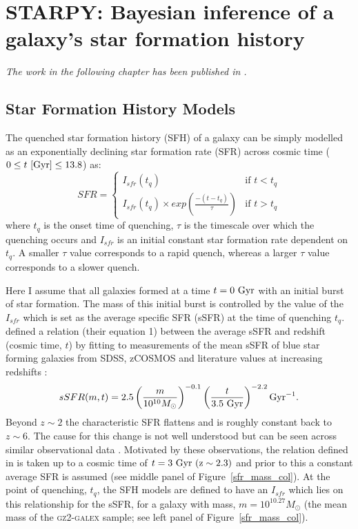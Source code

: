 \chapter{STARPY: Bayesian inference of a galaxy's star formation history}

\emph{The work in the following chapter has been published in \citet{smethurst15}.}
\\

\section{Star Formation History Models}\label{qmod}

The quenched star formation history (SFH) of a galaxy can be simply modelled as an exponentially declining star formation rate (SFR) across cosmic time ($0 \leq t ~\rm{[Gyr]} \leq 13.8$) as:
\begin{equation}\label{sfh}
SFR =
\begin{cases}
I_{sfr}(t_q) & \text{if } t < t_q \\
I_{sfr}(t_q) \times exp{\left( \frac{-(t-t_{q})}{\tau}\right)} & \text{if } t > t_q 
\end{cases}
\end{equation}
where $t_{q}$ is the onset time of quenching, $\tau$ is the timescale over which the quenching occurs and $I_{sfr}$ is an initial constant star formation rate dependent on $t_q$.  A smaller $\tau$ value corresponds to a rapid quench, whereas a larger $\tau$ value corresponds to a slower quench. 

Here I assume that all galaxies formed at a time $t=0~\rm{Gyr}$ with an initial burst of star formation. The mass of this initial burst is controlled by the value of the $I_{sfr}$ which is set as the average specific SFR (sSFR) at the time of quenching $t_q$.  \citet{peng10} defined a relation (their equation 1) between the average sSFR and redshift (cosmic time, $t$) by fitting to measurements of the mean sSFR of blue star forming galaxies from SDSS, zCOSMOS and literature values at increasing redshifts \citep{Elbaz07, Daddi07}:
\begin{equation}
sSFR(m,t) = 2.5 \left( \frac{m}{10^{10} M_{\odot}} \right)^{-0.1} \left(\frac{t}{3.5 ~\rm{Gyr}}\right)^{-2.2} \rm{Gyr}^{-1}.
\end{equation}
Beyond $z \sim 2$ the characteristic SFR flattens and is roughly constant back to $z\sim6$. The cause for this change is not well understood but can be seen across similar observational data \citep{peng10, gonzalez10, bethermin12}. Motivated by these observations, the relation defined in \citet{peng10} is taken up to a cosmic time of $t=3~\rm{Gyr}~(z \sim 2.3)$ and prior to this a constant average SFR is assumed (see middle panel of Figure~\ref{sfr_mass_col}). At the point of quenching, $t_{q}$, the SFH models are defined to have an $I_{sfr}$ which lies on this relationship for the sSFR, for a galaxy with mass, $m = 10^{10.27} M_{\odot}$ (the mean mass of the \textsc{gz2-galex} sample; see left panel of Figure~\ref{sfr_mass_col}).

